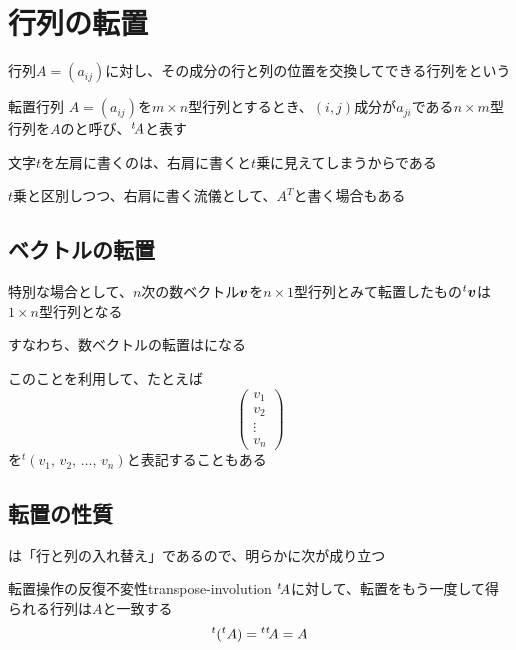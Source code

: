 \documentclass[../../../topic_linear-algebra]{subfiles}
\begin{document}
\sectionline
\section{行列の転置}

行列$A=(a_{ij})$に対し、その成分の行と列の位置を交換してできる行列をという

\begin{definition*}{転置行列}
  $A = (a_{ij})$を$m \times n$型行列とするとき、$(i,j)$成分が$a_{ji}$である$n \times m$型行列を$A$のと呼び、${}^t\! A$と表す
\end{definition*}

文字$t$を左肩に書くのは、右肩に書くと$t$乗に見えてしまうからである

$t$乗と区別しつつ、右肩に書く流儀として、$A^T$と書く場合もある

\subsection{ベクトルの転置}

特別な場合として、$n$次の数ベクトル$\vb*{v}$を$n \times 1$型行列とみて転置したもの${}^t\vb*{v}$は$1 \times n$型行列となる

すなわち、数ベクトルの転置はになる

\br

このことを利用して、たとえば
\begin{equation*}
  \begin{pmatrix}
    v_1    \\
    v_2    \\
    \vdots \\
    v_n
  \end{pmatrix}
\end{equation*}
を${}^t (v_1,\,v_2,\,\ldots,\,v_n)$と表記することもある

\subsection{転置の性質}

は「行と列の入れ替え」であるので、明らかに次が成り立つ

\begin{theorem}{転置操作の反復不変性}{transpose-involution}
  ${}^t\! A$に対して、転置をもう一度して得られる行列は$A$と一致する
  \begin{equation*}
    {}^t ({}^t A) = {}^t{}^t\! A = A
  \end{equation*}
\end{theorem}
\end{document}
